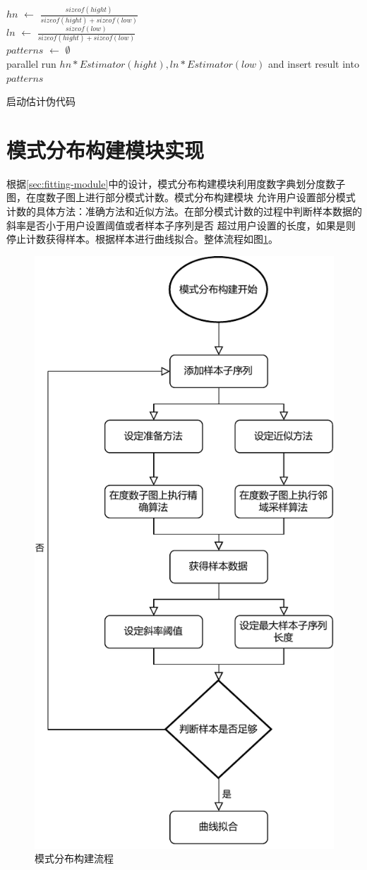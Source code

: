 \documentclass[master]{thesis-uestc}
\begin{document}
\begin{algorithm}
    $hn$ $\leftarrow$ $\frac{sizeof(hight)}{sizeof(hight)+sizeof(low)}$ \\
    $ln$ $\leftarrow$ $\frac{sizeof(low)}{sizeof(hight)+sizeof(low)}$ \\
    $patterns$ $\leftarrow$ $\emptyset$\\
    parallel run $hn * Estimator(hight), ln * Estimator(low)$ and insert result into $patterns$\\
    \caption{启动估计伪代码}
    \label{alg:launch}
\end{algorithm}

\section{模式分布构建模块实现}
\label{sec:fitting-impl}
    根据\ref{sec:fitting-module}中的设计，模式分布构建模块利用度数字典划分度数子图，在度数子图上进行部分模式计数。模式分布构建模块
允许用户设置部分模式计数的具体方法：准确方法和近似方法。在部分模式计数的过程中判断样本数据的斜率是否小于用户设置阈值或者样本子序列是否
超过用户设置的长度，如果是则停止计数获得样本。根据样本进行曲线拟合。整体流程如图\ref{fig:fit-flow}。
\begin{figure}
    \centering
    \includegraphics[width=.7\linewidth]{pic/fit_flow.pdf}
    \caption{模式分布构建流程}
    \label{fig:fit-flow}
\end{figure}
\end{document}
